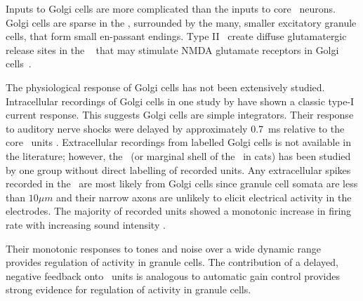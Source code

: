 


Inputs to Golgi cells are more complicated than the inputs to core \VCN~neurons.
Golgi cells are sparse in the \GCD, surrounded by the many, smaller excitatory granule cells, that form small en-passant endings.
Type II \ANFs~create diffuse glutamatergic release sites in the \GCD~\citep{HurdHutsonEtAl:1999,BensonBrown:2004} that may stimulate NMDA glutamate receptors in Golgi cells~\citep{FerragamoGoldingEtAl:1998a}.


The physiological response of Golgi cells has not been extensively studied.
Intracellular recordings of Golgi cells in one study by \citet{FerragamoGoldingEtAl:1998} have shown a classic type-I current response.
This suggests Golgi cells are simple integrators.
Their response to auditory nerve shocks were delayed by approximately 0.7~ms relative to the core \VCN~units \citep{FerragamoGoldingEtAl:1998}.
Extracellular recordings from labelled Golgi cells is not available in the literature; however, the \GCD~(or marginal shell of the \VCN~in cats) has been studied by one group \citet{GhoshalKim:1997} without direct labelling of recorded units.
Any extracellular spikes recorded in the \GCD~are most likely from Golgi cells since granule cell somata are less than $10 \mu{m}$ and their narrow axons are unlikely to elicit electrical activity in the electrodes.
The majority of recorded units showed a monotonic increase in firing rate with increasing sound intensity \citep[Figure~\ref{fig:GolgiKimFig2}][]{GhoshalKim:1997}.


Their monotonic responses to tones and noise over a wide dynamic range provides regulation of activity in granule cells.
The contribution of a delayed, negative feedback onto \VCN~units is analogous to automatic gain control provides strong evidence for regulation of activity in granule cells.

